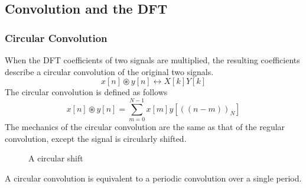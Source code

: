 \documentclass{article}
\begin{document}
\subsection{Convolution and the DFT}
\subsubsection{Circular Convolution}
When the DFT coefficients of two signals are multiplied, the resulting coefficients describe a circular convolution of the original two signals.
$$x[n]\circledast y[n] \leftrightarrow X[k]Y[k]$$
The circular convolution is defined as follows
$$x[n]\circledast y[n] = \sum_{m=0}^{N-1}x[m]y[((n-m))_N]$$
The mechanics of the circular convolution are the same as that of the regular convolution, except the signal is circularly shifted.
\begin{figure}[h!]
  \centering
  \caption{A circular shift}
\end{figure}
A circular convolution is equivalent to a periodic convolution over a single period.
\end{document}
